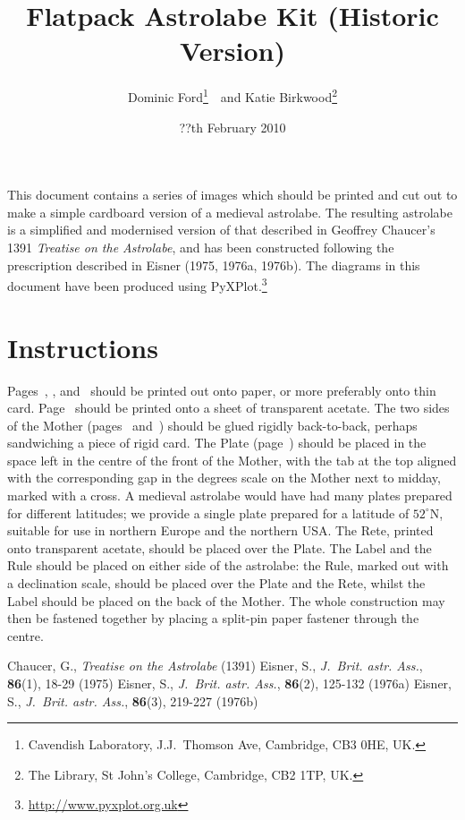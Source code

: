 \documentclass[a4paper,onecolumn,10pt]{article}
\title{\vspace{-3cm}Flatpack Astrolabe Kit (Historic Version)}
\author{Dominic Ford\footnote{Cavendish Laboratory, J.J.\ Thomson Ave, Cambridge, CB3 0HE, UK.}~~and Katie Birkwood\footnote{The Library, St John's College, Cambridge, CB2 1TP, UK.}}
\date{??th February 2010}
\begin{document}
\maketitle
\setcounter{footnote}{3}

This document contains a series of images which should be printed and cut out
to make a simple cardboard version of a medieval astrolabe. The resulting
astrolabe is a simplified and modernised version of that described in Geoffrey
Chaucer's 1391 {\it Treatise on the Astrolabe}, and has been constructed
following the prescription described in Eisner (1975, 1976a, 1976b). The
diagrams in this document have been produced using
PyXPlot.\footnote{\url{http://www.pyxplot.org.uk}}

\section*{Instructions}

Pages~\pageref{mother_back}, \pageref{mother_front}, \pageref{plate}
and~\pageref{rule} should be printed out onto paper, or more preferably onto
thin card.  Page~\pageref{rete} should be printed onto a sheet of transparent
acetate. The two sides of the Mother (pages~\pageref{mother_back}
and~\pageref{mother_front}) should be glued rigidly back-to-back, perhaps
sandwiching a piece of rigid card. The Plate (page~\pageref{plate}) should be
placed in the space left in the centre of the front of the Mother, with the tab
at the top aligned with the corresponding gap in the degrees scale on the
Mother next to midday, marked with a cross. A medieval astrolabe would have had
many plates prepared for different latitudes; we provide a single plate
prepared for a latitude of $52^\circ$N, suitable for use in northern Europe and
the northern USA. The Rete, printed onto transparent acetate, should be placed
over the Plate.  The Label and the Rule should be placed on either side of the
astrolabe: the Rule, marked out with a declination scale, should be placed over
the Plate and the Rete, whilst the Label should be placed on the back of the
Mother. The whole construction may then be fastened together by placing a
split-pin paper fastener through the centre.

\begin{thebibliography}{9}
Chaucer, G., \textit{Treatise on the Astrolabe} (1391)
Eisner, S., \textit{J.\ Brit. astr. Ass.}, \textbf{86}(1), 18-29 (1975)
Eisner, S., \textit{J.\ Brit. astr. Ass.}, \textbf{86}(2), 125-132 (1976a)
Eisner, S., \textit{J.\ Brit. astr. Ass.}, \textbf{86}(3), 219-227 (1976b)
\end{thebibliography}
\end{document}
